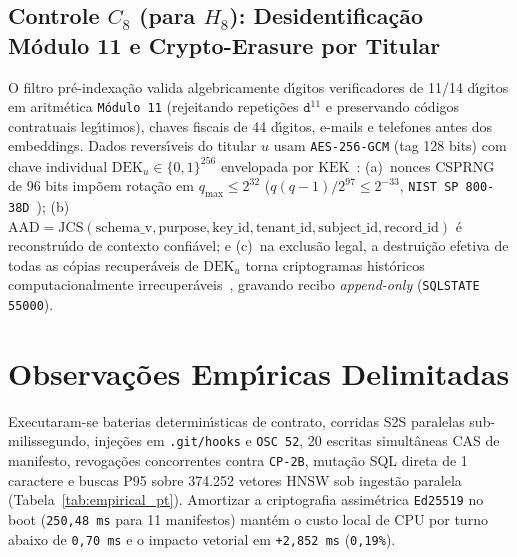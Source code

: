 \documentclass[10pt,twocolumn]{article}
\begin{document}
\subsection{Controle $C_8$ (para $H_8$): Desidentifica\c{c}\~{a}o M\'{o}dulo 11 e Crypto-Erasure por Titular}

O filtro pr\'{e}-indexa\c{c}\~{a}o valida algebricamente d\'{\i}gitos verificadores de 11/14 d\'{\i}gitos em aritm\'{e}tica \texttt{M\'{o}dulo 11} (rejeitando repeti\c{c}\~{o}es $\texttt{d}^{11}$ e preservando c\'{o}digos contratuais leg\'{\i}timos), chaves fiscais de 44 d\'{\i}gitos, e-mails e telefones antes dos embeddings. Dados revers\'{\i}veis do titular $u$ usam \texttt{AES-256-GCM} (tag 128 bits) com chave individual $\mathrm{DEK}_u \in \{0,1\}^{256}$ envelopada por $\mathrm{KEK}$~\cite{R06,R09}: (a)~nonces CSPRNG de 96 bits imp\~{o}em rota\c{c}\~{a}o em $q_{\max} \le 2^{32}$ ($q(q-1)/2^{97} \le 2^{-33}$, \texttt{NIST SP 800-38D}~\cite{R09}); (b)~$\mathrm{AAD} = \mathrm{JCS}(\mathrm{schema\_v}, \mathrm{purpose}, \mathrm{key\_id}, \mathrm{tenant\_id}, \mathrm{subject\_id}, \mathrm{record\_id})$ \'{e} reconstru\'{\i}do de contexto confi\'{a}vel; e (c)~na exclus\~{a}o legal, a destrui\c{c}\~{a}o efetiva de todas as c\'{o}pias recuper\'{a}veis de $\mathrm{DEK}_u$ torna criptogramas hist\'{o}ricos computacionalmente irrecuper\'{a}veis~\cite{R10,R14}, gravando recibo \emph{append-only} (\texttt{SQLSTATE 55000}).

\section{Observa\c{c}\~{o}es Emp\'{\i}ricas Delimitadas}

Executaram-se baterias determin\'{\i}sticas de contrato, corridas S2S paralelas sub-milissegundo, inje\c{c}\~{o}es em \texttt{.git/hooks} e \texttt{OSC 52}, 20 escritas simult\^{a}neas CAS de manifesto, revoga\c{c}\~{o}es concorrentes contra \texttt{CP-2B}, muta\c{c}\~{a}o SQL direta de 1 caractere e buscas P95 sobre 374.252 vetores HNSW sob ingest\~{a}o paralela (Tabela~\ref{tab:empirical_pt}). Amortizar a criptografia assim\'{e}trica \texttt{Ed25519} no boot (\texttt{250,48 ms} para 11 manifestos) mant\'{e}m o custo local de CPU por turno abaixo de \texttt{0,70 ms} e o impacto vetorial em \texttt{+2,852 ms} (\texttt{0,19\%}).
\end{document}
